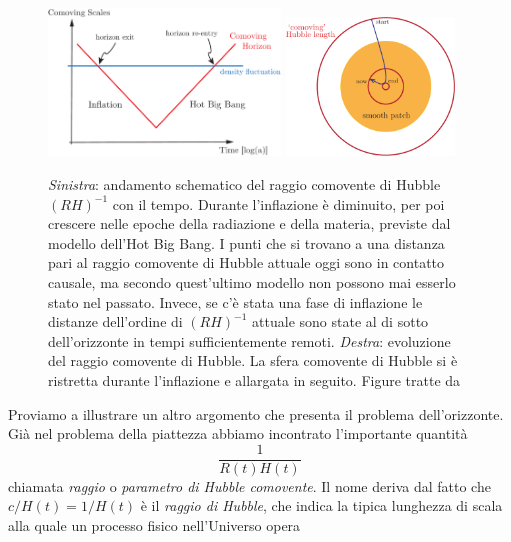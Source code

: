 \begin{figure}
  \centering
  \includegraphics[width=0.55\textwidth]{figure/scales}\hfill
  \includegraphics[width=0.4\textwidth]{figure/horizon}
  \caption[Come l'inflazione risolve il problema
  dell'orizzonte]{\emph{Sinistra}: andamento schematico del raggio comovente di
    Hubble \((RH)^{-1}\) con il tempo.  Durante l'inflazione è diminuito, per
    poi crescere nelle epoche della radiazione e della materia, previste dal
    modello dell'Hot Big Bang.  I punti che si trovano a una distanza pari al
    raggio comovente di Hubble attuale oggi sono in contatto causale, ma secondo
    quest'ultimo modello non possono mai esserlo stato nel passato.  Invece, se
    c'è stata una fase di inflazione le distanze dell'ordine di \((RH)^{-1}\)
    attuale sono state al di sotto dell'orizzonte in tempi sufficientemente
    remoti.  \emph{Destra}: evoluzione del raggio comovente di Hubble.  La sfera
    comovente di Hubble si è ristretta durante l'inflazione e allargata in
    seguito.  Figure tratte da~\cite[27]{2009arXiv0907.5424B}}
  \label{fig:orizzonte}
\end{figure}
Proviamo a illustrare un altro argomento che presenta il problema
dell'orizzonte.  Già nel problema della piattezza abbiamo incontrato
l'importante quantità
\begin{equation}
  \frac{1}{R(t)H(t)}
\end{equation}
chiamata \emph{raggio} o \emph{parametro di Hubble comovente}.  Il nome deriva
dal fatto che \(c/H(t) = 1/H(t)\) è il \emph{raggio di Hubble}, che indica la
tipica lunghezza di scala alla quale un processo fisico nell'Universo opera
